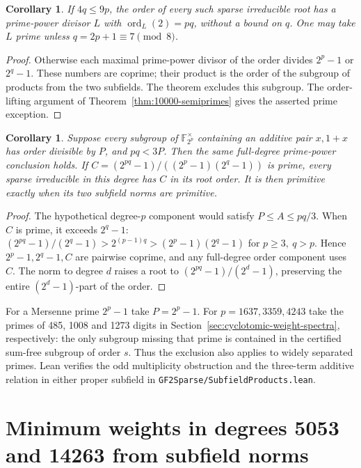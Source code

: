 \documentclass[11pt]{article}
\newtheorem{corollary}[theorem]{Corollary}
\newcommand{\ord}{\operatorname{ord}}
\begin{document}
\begin{corollary}\label{cor:semiprime-parity}
If \(4q\le9p\), the order of every such sparse irreducible root has
a prime-power divisor \(L\) with \(\ord_L(2)=pq\), without a bound on
\(q\). One may take \(L\) prime unless \(q=2p+1\equiv7\pmod8\).
\end{corollary}
\begin{proof}
Otherwise each maximal prime-power divisor of the order divides
\(2^p-1\) or \(2^q-1\). These numbers are coprime; their product
is the order of the subgroup of products from the two subfields.
The theorem excludes this subgroup. The order-lifting argument of
Theorem~\ref{thm:10000-semiprimes} gives the asserted prime exception.
\end{proof}

\begin{corollary}\label{cor:semiprime-forced-norm}
Suppose every subgroup of \(\mathbb F_{2^p}^{\times}\) containing an
additive pair \(x,1+x\) has order divisible by \(P\), and \(pq<3P\).
Then the same full-degree prime-power conclusion holds. If
\(C=(2^{pq}-1)/((2^p-1)(2^q-1))\) is prime, every sparse irreducible
in this degree has \(C\) in its root order. It is then primitive exactly
when its two subfield norms are primitive.
\end{corollary}
\begin{proof}
The hypothetical degree-\(p\) component would satisfy
\(P\le A\le pq/3\). When \(C\) is prime, it exceeds \(2^q-1\):
\((2^{pq}-1)/(2^q-1)>2^{(p-1)q}>(2^p-1)(2^q-1)\) for
\(p\ge3,\ q>p\). Hence \(2^p-1,2^q-1,C\) are pairwise coprime,
and any full-degree order component uses \(C\). The norm to degree
\(d\) raises a root to \((2^{pq}-1)/(2^d-1)\), preserving the entire
\((2^d-1)\)-part of the order.
\end{proof}

For a Mersenne prime \(2^p-1\) take \(P=2^p-1\).
For \(p=1637,3359,4243\) take the primes of 485, 1008 and 1273 digits
in Section~\ref{sec:cyclotomic-weight-spectra}, respectively: the only
subgroup missing that prime is contained in the certified sum-free
subgroup of order \(s\). Thus the exclusion also applies to widely
separated primes. Lean verifies the odd multiplicity obstruction and the
three-term additive relation in either proper subfield in
\nolinkurl{GF2Sparse/SubfieldProducts.lean}.

\clearpage
\section{Minimum weights in degrees 5053 and 14263 from subfield norms}
\label{sec:semiprime-norm-witnesses}
\end{document}
